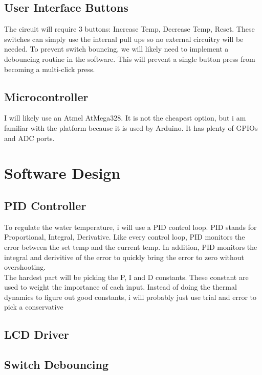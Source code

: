 \documentclass[12pt,letterpaper]{article}
\begin{document}
\subsection{User Interface Buttons}
The circuit will require 3 buttons:  Increase Temp, Decrease Temp, Reset.
These switches can simply use the internal pull ups so no external circuitry will be needed.
To prevent switch bouncing, we will likely need to implement a debouncing routine in the software.
This will prevent a single button press from becoming a multi-click press.

\subsection{Microcontroller}
I will likely use an Atmel AtMega328.
It is not the cheapest option, but i am familiar with the platform because it is used by Arduino.
It has plenty of GPIOs and ADC ports.

\section{Software Design}
\subsection{PID Controller}
To regulate the water temperature, i will use a PID control loop.
PID stands for Proportional, Integral, Derivative.  
Like every control loop, PID monitors the error between the set temp and the current temp.
In addition, PID monitors the integral and derivitive of the error to quickly bring the error to zero without overshooting.\\

The hardest part will be picking the P, I and D constants. 
These constant are used to weight the importance of each input.  
Instead of doing the thermal dynamics to figure out good constants, i will probably just use trial and error to pick a conservative

\subsection{LCD Driver}
\subsection{Switch Debouncing}
\end{document}
